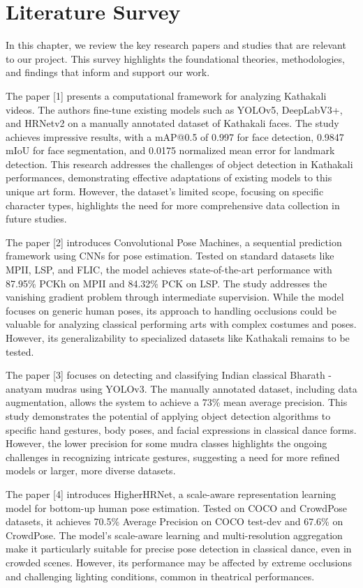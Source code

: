 \chapter{Literature Survey}
In this chapter, we review the key research papers and studies that are relevant to our project. This survey highlights the foundational theories, methodologies, and findings that inform and support our work.

The paper [1] presents a computational framework for analyzing Kathakali videos. The authors fine-tune existing models such as YOLOv5, DeepLabV3+, and HRNetv2 on a manually annotated dataset of Kathakali faces. The study achieves impressive results, with a mAP@0.5 of 0.997 for face detection, 0.9847 mIoU for face segmentation, and 0.0175 normalized mean error for landmark detection. This research addresses the challenges of object detection in Kathakali performances, demonstrating effective adaptations of existing models to this unique art form. However, the dataset's limited scope, focusing on specific character types, highlights the need for more comprehensive data collection in future studies.

The paper [2] introduces Convolutional Pose Machines, a sequential prediction framework using CNNs for pose estimation. Tested on standard datasets like MPII, LSP, and FLIC, the model achieves state-of-the-art performance with 87.95\% PCKh on MPII and 84.32\% PCK on LSP. The study addresses the vanishing gradient problem through intermediate supervision. While the model focuses on generic human poses, its approach to handling occlusions could be valuable for analyzing classical performing arts with complex costumes and poses. However, its generalizability to specialized datasets like Kathakali remains to be tested.

The paper [3] focuses on detecting and classifying Indian classical Bharath
-anatyam mudras using YOLOv3. The manually annotated dataset, including data augmentation, allows the system to achieve a 73\% mean average precision. This study demonstrates the potential of applying object detection algorithms to specific hand gestures, body poses, and facial expressions in classical dance forms. However, the lower precision for some mudra classes highlights the ongoing challenges in recognizing intricate gestures, suggesting a need for more refined models or larger, more diverse datasets.

The paper [4] introduces HigherHRNet, a scale-aware representation learning model for bottom-up human pose estimation. Tested on COCO and CrowdPose datasets, it achieves 70.5\% Average Precision on COCO test-dev and 67.6\% on CrowdPose. The model's scale-aware learning and multi-resolution aggregation make it particularly suitable for precise pose detection in classical dance, even in crowded scenes. However, its performance may be affected by extreme occlusions and challenging lighting conditions, common in theatrical performances.

